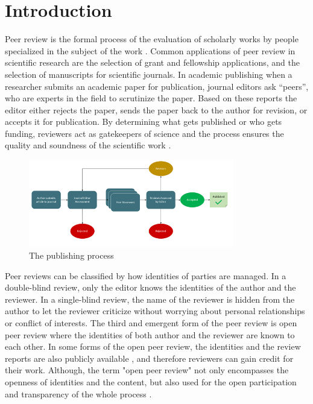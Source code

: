 
\chapter{Introduction}\label{chapter:introduction}

Peer review is the formal process of the evaluation of scholarly works by people specialized in the subject of the work \parencite[p.~864]{Moxham.2018}. Common applications of peer review in scientific research are the selection of grant and fellowship applications, and the selection of manuscripts for scientific journals. In academic publishing when a researcher submits an academic paper for publication, journal editors ask “peers”, who are experts in the field to scrutinize the paper. Based on these reports the editor either rejects the paper, sends the paper back to the author for revision, or accepts it for publication. By determining what gets published or who gets funding, reviewers act as gatekeepers of science and the process ensures the quality and soundness of the scientific work \parencite{Bornmann.2011}.

\begin{figure}[htpb]
  \centering
  \includegraphics[width=0.8\textwidth]{figures/publishing-process.png}
  \caption{The publishing process} \label{fig:publishing-process}
\end{figure}

Peer reviews can be classified by how identities of parties are managed. In a double-blind review, only the editor knows the identities of the author and the reviewer. In a single-blind review, the name of the reviewer is hidden from the author to let the reviewer criticize without worrying about personal relationships or conflict of interests. The third and emergent form of the peer review is open peer review where the identities of both author and the reviewer are known to each other. In some forms of the open peer review, the identities and the review reports are also publicly available \parencite[4]{HorbachS.P.J.M..2017}, and therefore reviewers can gain credit for their work. Although, the term "open peer review" not only encompasses the openness of identities and the content, but also used for the open participation and transparency of the whole process \parencite{RossHellauer.2017}.

